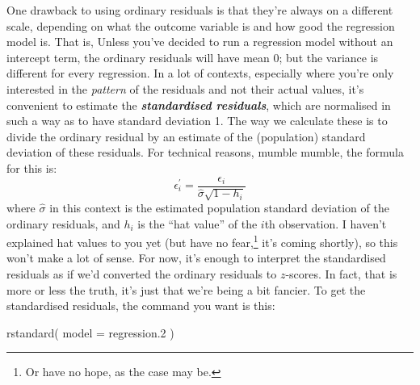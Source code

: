 \documentclass[
]{book}
\newenvironment{Shaded}{\begin{snugshade}}{\end{snugshade}}
\newcommand{\AttributeTok}[1]{\textcolor[rgb]{0.77,0.63,0.00}{#1}}
\newcommand{\FloatTok}[1]{\textcolor[rgb]{0.00,0.00,0.81}{#1}}
\newcommand{\FunctionTok}[1]{\textcolor[rgb]{0.00,0.00,0.00}{#1}}
\newcommand{\NormalTok}[1]{#1}
\begin{document}
One drawback to using ordinary residuals is that they're always on a different scale, depending on what the outcome variable is and how good the regression model is. That is, Unless you've decided to run a regression model without an intercept term, the ordinary residuals will have mean 0; but the variance is different for every regression. In a lot of contexts, especially where you're only interested in the \emph{pattern} of the residuals and not their actual values, it's convenient to estimate the \textbf{\emph{standardised residuals}}, which are normalised in such a way as to have standard deviation 1. The way we calculate these is to divide the ordinary residual by an estimate of the (population) standard deviation of these residuals. For technical reasons, mumble mumble, the formula for this is:
\[
\epsilon_{i}^\prime = \frac{\epsilon_i}{\hat{\sigma} \sqrt{1-h_i}}
\]
where \(\hat\sigma\) in this context is the estimated population standard deviation of the ordinary residuals, and \(h_i\) is the ``hat value'' of the \(i\)th observation. I haven't explained hat values to you yet (but have no fear,\footnote{Or have no hope, as the case may be.} it's coming shortly), so this won't make a lot of sense. For now, it's enough to interpret the standardised residuals as if we'd converted the ordinary residuals to \(z\)-scores. In fact, that is more or less the truth, it's just that we're being a bit fancier. To get the standardised residuals, the command you want is this:

\begin{Shaded}
\begin{Highlighting}[]
\FunctionTok{rstandard}\NormalTok{( }\AttributeTok{model =}\NormalTok{ regression}\FloatTok{.2}\NormalTok{ )}
\end{Highlighting}
\end{Shaded}
\end{document}
